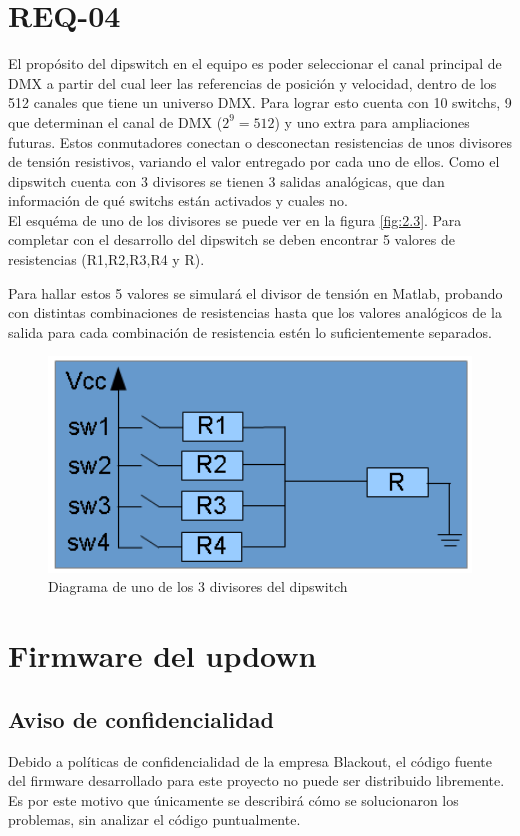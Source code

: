 \section{REQ-04} \label{sec:\thesection}
El propósito del dipswitch en el equipo es poder seleccionar el canal principal de DMX a partir del cual leer las referencias de posición y velocidad, dentro de los 512 canales que tiene un universo DMX. Para lograr esto cuenta con 10 switchs, 9 que determinan el canal de DMX (\( 2^9 = 512 \)) y uno extra para ampliaciones futuras. Estos conmutadores conectan o desconectan resistencias de unos divisores de tensión resistivos, variando el valor entregado por cada uno de ellos. Como el dipswitch cuenta con 3 divisores se tienen 3 salidas analógicas, que dan información de qué switchs están activados y cuales no. \\
El esquéma de uno de los divisores se puede ver en la figura \ref{fig:2.3}. Para completar con el desarrollo del dipswitch se deben encontrar 5 valores de resistencias (R1,R2,R3,R4 y R).

Para hallar estos 5 valores se simulará el divisor de tensión en Matlab, probando con distintas combinaciones de resistencias hasta que los valores analógicos de la salida para cada combinación de resistencia estén lo suficientemente separados.

\begin{figure}[!ht]
	\centering
	\includegraphics[width=12cm,scale=1]{resources/2_3-dipswitch.png}
	\caption{Diagrama de uno de los 3 divisores del dipswitch}
	\label{fig:\thefigure}
\end{figure}

\section{Firmware del updown} \label{sec:\thesection}
\subsection{Aviso de confidencialidad}
Debido a políticas de confidencialidad de la empresa Blackout, el código fuente del firmware desarrollado para este proyecto no puede ser distribuido libremente. Es por este motivo que únicamente se describirá cómo se solucionaron los problemas, sin analizar el código puntualmente.

